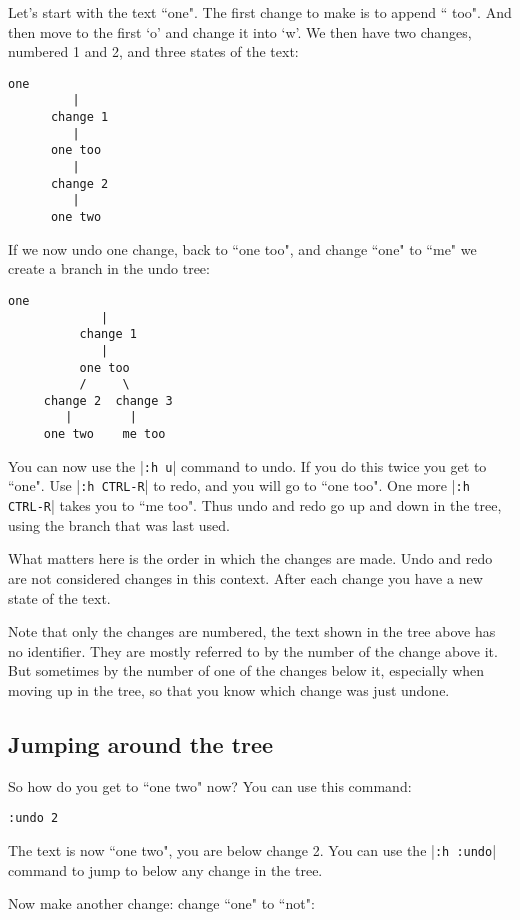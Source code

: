 Let's start with the text ``one".
The first change to make is to append `` too".
And then move to the first `o' and change it into `w'.
We then have two changes, numbered 1 and 2, and three states of the text:

\begin{Verbatim}[samepage=true]
        one
         |
      change 1
         |
      one too
         |
      change 2
         |
      one two
\end{Verbatim}

If we now undo one change, back to ``one too", and change ``one" to ``me" we create a branch in the undo tree:

\begin{Verbatim}[samepage=true]
            one
             |
          change 1
             |
          one too
          /     \
     change 2  change 3
        |        |
     one two    me too
\end{Verbatim}

You can now use the |\texttt{:h u}| command to undo.
If you do this twice you get to ``one".
Use |\texttt{:h CTRL-R}| to redo, and you will go to ``one too".
One more |\texttt{:h CTRL-R}| takes you to ``me too".
Thus undo and redo go up and down in the tree, using the branch that was last used.

What matters here is the order in which the changes are made.
Undo and redo are not considered changes in this context.
After each change you have a new state of the text.

Note that only the changes are numbered, the text shown in the tree above has no identifier.
They are mostly referred to by the number of the change above it.
But sometimes by the number of one of the changes below it, especially when moving up in the tree, so that you know which change was just undone.
\subsection{Jumping around the tree}
So how do you get to ``one two" now?  You can use this command:

\begin{Verbatim}[samepage=true]
 :undo 2
\end{Verbatim}

The text is now ``one two", you are below change 2.
You can use the |\texttt{:h :undo}| command to jump to below any change in the tree.

Now make another change: change ``one" to ``not":

